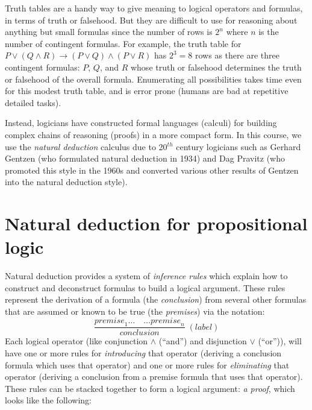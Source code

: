 Truth tables are a handy way to give meaning to logical operators and
formulas, in terms of truth or falsehood. But they are difficult to
use for reasoning about anything but small formulas since the number
of rows is $2^n$ where $n$ is the number of contingent
formulas. For example, the truth table for
$P \vee (Q \wedge R) \rightarrow (P \vee Q) \wedge (P \vee R)$ has
$2^3 = 8$ rows as there are three contingent formulas: $P$, $Q$, and
$R$ whose truth or falsehood determines the truth or falsehood of the
overall formula. Enumerating all possibilities takes time even for
this modest truth table, and is error prone (humans are
bad at repetitive detailed tasks).

Instead, logicians have constructed formal languages (calculi) for
building complex chains of reasoning (proofs) in a more
compact form. In this course, we use the \emph{natural deduction} calculus
due to 20$^{th}$ century logicians such as Gerhard Gentzen
(who formulated natural deduction in 1934) and Dag Pravitz (who
promoted this style in the 1960s and converted
various other results of Gentzen into the natural deduction style).

\section{Natural deduction for propositional logic}

Natural deduction provides a system of \emph{inference rules} which
explain how to construct and deconstruct formulas to build
a logical argument. These rules represent the derivation of a formula
(the \emph{conclusion}) from several other formulas that are assumed or known to be true
(the \emph{premises}) via the notation:
%
\begin{equation*}
  \dfrac{\textit{premise}_1 \ldots \quad \ldots \textit{premise}_n}
        {\textit{conclusion}}
    \; {(\textit{label})}
\end{equation*}
%
Each logical operator (like conjunction $\wedge$ (``and'') and
disjunction $\vee$ (``or'')), will have one or more rules for \emph{introducing}
that operator (deriving a conclusion formula which uses that operator) and one or
more rules for \emph{eliminating} that operator (deriving a conclusion
from a premise formula that uses that operator). These rules can be stacked together to form a
logical argument: \emph{a proof}, which looks like the following:

